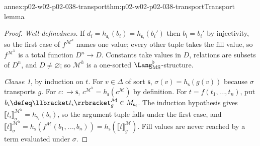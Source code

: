 \begin{annexitem}{annex:p02-w02-p02-038-transport}{thm:p02-w02-p02-038-transport}{Transport lemma}
\begin{proof}
\emph{Well-definedness.}  If \(d_i=h_{\mathsf s_i}(b_i)=h_{\mathsf s_i}(b_i')\)
then \(b_i=b_i'\) by injectivity, so the first case of \(f^{\mathcal M^{h}}\)
names one value; every other tuple takes the fill value, so
\(f^{\mathcal M^{h}}\) is a total function \(D^n\to D\).  Constants take
values in \(D\), relations are subsets of \(D^n\), and \(D\ne\varnothing\);
so \(\mathcal M^{h}\) is a one-sorted \(\Lang_{\mathrm{MS}}^{\flat}\)-structure.

\emph{Clause 1}, by induction on \(t\).  For \(v\in\Delta\) of sort
\(\mathsf s\), \(\sigma(v)=h_{\mathsf s}(g(v))\) because \(\sigma\)
transports \(g\).  For \(c:\longrightarrow\mathsf s\),
\(c^{\mathcal M^{h}}=h_{\mathsf s}(c^{\mathcal M})\) by definition.  For
\(t=f(t_1,\ldots,t_n)\), put
\(b_i\defeq\llbracket t_i\rrbracket^{\mathcal M}_{g}\in M_{\mathsf s_i}\).
The induction hypothesis gives
\(\llbracket t_i\rrbracket^{\mathcal M^{h}}_{\sigma}=h_{\mathsf s_i}(b_i)\),
so the argument tuple falls under the first case, and
\(\llbracket t\rrbracket^{\mathcal M^{h}}_{\sigma}=
h_{\mathsf s}(f^{\mathcal M}(b_1,\ldots,b_n))=
h_{\mathsf s}(\llbracket t\rrbracket^{\mathcal M}_{g})\).  Fill values are
never reached by a term evaluated under \(\sigma\).


\end{proof}
\end{annexitem}
